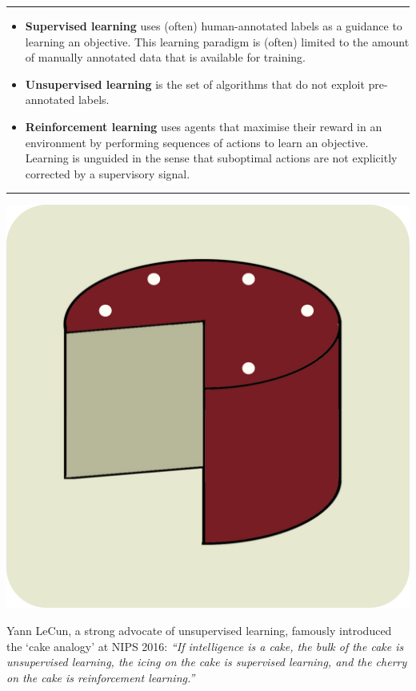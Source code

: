 
\noindent\rule{\textwidth}{0.5pt}

\begin{itemize}
    \item \textbf{Supervised learning} uses (often) human-annotated labels as a guidance to learning an objective. This learning paradigm is (often) limited to the amount of manually annotated data that is available for training.
    \item \textbf{Unsupervised learning} is the set of algorithms that do not exploit pre-annotated labels.
    \item \textbf{Reinforcement learning} uses agents that maximise their reward in an environment by performing sequences of actions to learn an objective. Learning is unguided in the sense that suboptimal actions are not explicitly corrected by a supervisory signal.
\end{itemize}

\noindent\rule{\textwidth}{0.5pt}

\begin{marginfigure}[{0cm}]
    \includegraphics[width=\textwidth]{figs/cake_analogy.pdf}
    \caption{Yann LeCun, a strong advocate of unsupervised learning, famously introduced the `cake analogy' at NIPS 2016: \textit{``If intelligence is a cake, the bulk of the cake is unsupervised learning, the icing on the cake is supervised learning, and the cherry on the cake is reinforcement learning.''}}
    \label{fig:cake_analogy}
\end{marginfigure}



